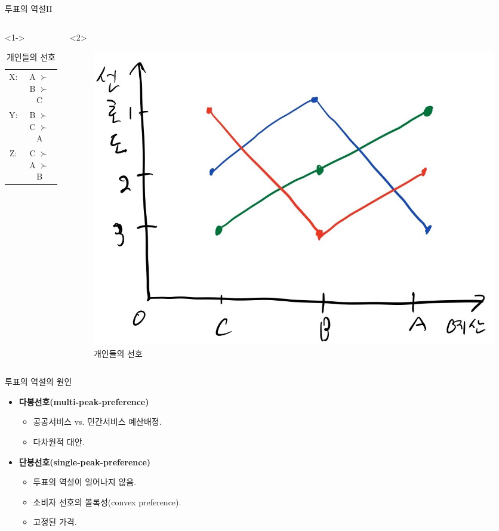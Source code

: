 \documentclass[aspectratio=169,xcolor=dvipsnames,handout]{beamer}
\begin{document}
\begin{frame}{투표의 역설II}
    \begin{columns}
        \begin{column}{.5\textwidth}<1->
            \begin{table}[]
                \begin{tabular}{cc}
                     X: & A $\succ$ B $\succ$ C \\
                     Y: & B $\succ$ C $\succ$ A \\
                     Z: & C $\succ$ A $\succ$ B
                \end{tabular}
                \caption{개인들의 선호}
            \end{table}
        \end{column}
        \begin{column}{.5\textwidth}<2>
            \begin{figure}
                \centering
                \includegraphics[width=.8\textwidth]{pic/voting2.jpg}
                \caption{개인들의 선호}
            \end{figure}
        \end{column}
    \end{columns}
\end{frame}

\begin{frame}{투표의 역설의 원인}
    \begin{itemize}[<+->]
        \item {\bf 다봉선호(multi-peak-preference)}
        \begin{itemize}
            \item 공공서비스 vs. 민간서비스 예산배정.
            \item 다차원적 대안.
        \end{itemize}
        \item {\bf 단봉선호(single-peak-preference)}
        \begin{itemize}
            \item 투표의 역설이 일어나지 않음.
            \item 소비자 선호의 볼록성(convex preference).
            \item 고정된 가격.
        \end{itemize}
    \end{itemize}
\end{frame}
\end{document}
